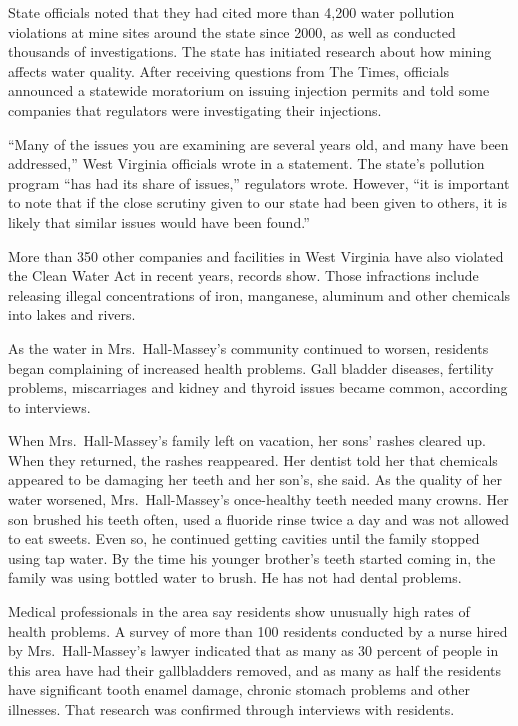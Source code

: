 ﻿\documentclass[12pt]{article}
\begin{document}
State officials noted that they had cited more than 4,200 water pollution violations at mine sites
around the state since 2000, as well as conducted thousands of investigations. The state has
initiated research about how mining affects water quality. After receiving questions from The Times,
officials announced a statewide moratorium\cite{moratorium} on issuing injection permits and told
some companies that regulators were investigating their injections.

``Many of the issues you are examining are several years old, and many have been addressed,'' West
Virginia officials wrote in a statement. The state's pollution program ``has had its share of
issues,'' regulators wrote. However, ``it is important to note that if the close scrutiny given to
our state had been given to others, it is likely that similar issues would have been found.''

More than 350 other companies and facilities in West Virginia have also violated the Clean Water Act
in recent years, records show. Those infractions include releasing illegal concentrations of iron,
manganese, aluminum and other chemicals into lakes and rivers.

As the water in Mrs.~Hall-Massey's community continued to worsen, residents began complaining of
increased health problems. Gall bladder diseases, fertility problems, miscarriages and kidney and
thyroid issues became common, according to interviews.

When Mrs.~Hall-Massey's family left on vacation, her sons' rashes\cite{rash} cleared up. When they
returned, the rashes reappeared. Her dentist told her that chemicals appeared to be damaging her
teeth and her son's, she said. As the quality of her water worsened, Mrs.~Hall-Massey's once-healthy
teeth needed many crowns. Her son brushed his teeth often, used a fluoride rinse twice a day and was
not allowed to eat sweets. Even so, he continued getting cavities until the family stopped using tap
water. By the time his younger brother's teeth started coming in, the family was using bottled water
to brush. He has not had dental problems.

Medical professionals in the area say residents show unusually high rates of health problems. A
survey of more than 100 residents conducted by a nurse hired by Mrs.~Hall-Massey's lawyer indicated
that as many as 30 percent of people in this area have had their gallbladders removed, and as many
as half the residents have significant tooth enamel\cite{enamel} damage, chronic stomach problems
and other illnesses. That research was confirmed through interviews with residents.
\end{document}
